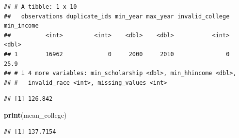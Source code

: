 \documentclass[
]{article}
\newenvironment{Shaded}{\begin{snugshade}}{\end{snugshade}}
\newcommand{\CommentTok}[1]{\textcolor[rgb]{0.56,0.35,0.01}{\textit{#1}}}
\newcommand{\DecValTok}[1]{\textcolor[rgb]{0.00,0.00,0.81}{#1}}
\newcommand{\FunctionTok}[1]{\textcolor[rgb]{0.13,0.29,0.53}{\textbf{#1}}}
\newcommand{\NormalTok}[1]{#1}
\newcommand{\OtherTok}[1]{\textcolor[rgb]{0.56,0.35,0.01}{#1}}
\newcommand{\SpecialCharTok}[1]{\textcolor[rgb]{0.81,0.36,0.00}{\textbf{#1}}}
\begin{document}
\begin{verbatim}
## # A tibble: 1 x 10
##   observations duplicate_ids min_year max_year invalid_college min_income
##          <int>         <int>    <dbl>    <dbl>           <int>      <dbl>
## 1        16962             0     2000     2010               0       25.9
## # i 4 more variables: min_scholarship <dbl>, min_hhincome <dbl>,
## #   invalid_race <int>, missing_values <int>
\end{verbatim}

\begin{Shaded}
\end{Shaded}

\begin{verbatim}
## [1] 126.842
\end{verbatim}

\begin{Shaded}
\begin{Highlighting}[]
\FunctionTok{print}\NormalTok{(mean\_college)}
\end{Highlighting}
\end{Shaded}

\begin{verbatim}
## [1] 137.7154
\end{verbatim}
\end{document}
